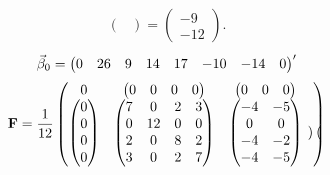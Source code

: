 \begin{Example}{}{}
\begin{align*}
\begin{pmatrix}
                                       \end{pmatrix}=\begin{pmatrix}
                                                         -9 \\
                                                         -12
                                                     \end{pmatrix}.
    \end{align*}
    \[ \vec{\beta}_0=\begin{pmatrix}
            0 & 26 & 9 & 14 & 17 & -10 & -14 & 0
        \end{pmatrix}' \]
    \[ \mathbf{F}=\frac{1}{12}\begin{pmatrix}
            0               & \begin{pmatrix}
                                  0 & 0 & 0 & 0
                              \end{pmatrix}     & \begin{pmatrix}
                                                      0 & 0 & 0
                                                  \end{pmatrix}             \\
            \begin{pmatrix}
                0 \\
                0 \\
                0 \\
                0
            \end{pmatrix} & \begin{pmatrix}
                                7 & 0  & 2 & 3 \\
                                0 & 12 & 0 & 0 \\
                                2 & 0  & 8 & 2 \\
                                3 & 0  & 2 & 7
                            \end{pmatrix}   & \begin{pmatrix}
                                                  -4 & -5 \\
                                                  0  & 0  \\
                                                  -4 & -2 \\
                                                  -4 & -5
                                              \end{pmatrix} & \begin{pmatrix}

\end{pmatrix}
\end{pmatrix}\]
\end{Example}
